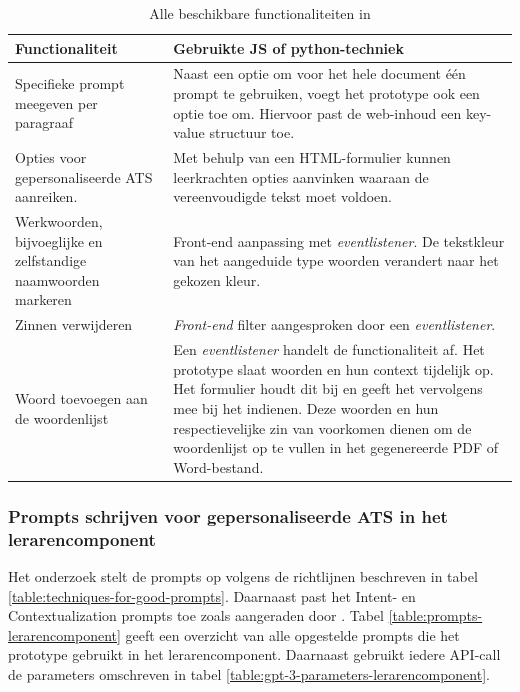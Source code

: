 \begin{center}
	\begin{table}[H]
		\begin{tabular}{ | m{7cm} | m{8cm} | } 
			\hline
			\textbf{Functionaliteit} & Gebruikte JS of python-techniek \\
			\hline
			Specifieke prompt meegeven per paragraaf & Naast een optie om voor het hele document één prompt te gebruiken, voegt het prototype ook een optie toe om. Hiervoor past de web-inhoud een key-value structuur toe. \\
			\hline
			Opties voor gepersonaliseerde ATS aanreiken. & Met behulp van een HTML-formulier kunnen leerkrachten opties aanvinken waaraan de vereenvoudigde tekst moet voldoen. \\
			\hline
			Werkwoorden, bijvoeglijke en zelfstandige naamwoorden markeren & Front-end aanpassing met \textit{eventlistener}. De tekstkleur van het aangeduide type woorden verandert naar het gekozen kleur. \\
			\hline
			Zinnen verwijderen & \textit{Front-end} filter aangesproken door een \textit{eventlistener}. \\
			\hline
			Woord toevoegen aan de woordenlijst & Een \textit{eventlistener} handelt de functionaliteit af. Het prototype slaat woorden en hun context tijdelijk op. Het formulier houdt dit bij en geeft het vervolgens mee bij het indienen. Deze woorden en hun respectievelijke zin van voorkomen dienen om de woordenlijst op te vullen in het gegenereerde PDF of Word-bestand. \\ 
			\hline 
		\end{tabular}
	\caption{Alle beschikbare functionaliteiten in }
	\label{table:functionaliteiten-leerkrachten}
	\end{table}
\end{center}

\subsubsection{Prompts schrijven voor gepersonaliseerde ATS in het lerarencomponent}

Het onderzoek stelt de prompts op volgens de richtlijnen beschreven in tabel \ref{table:techniques-for-good-prompts}. Daarnaast past het Intent- en Contextualization prompts toe zoals aangeraden door \textcite{White2023}. Tabel \ref{table:prompts-lerarencomponent} geeft een overzicht van alle opgestelde prompts die het prototype gebruikt in het lerarencomponent. Daarnaast gebruikt iedere API-call de parameters omschreven in tabel \ref{table:gpt-3-parameters-lerarencomponent}.

